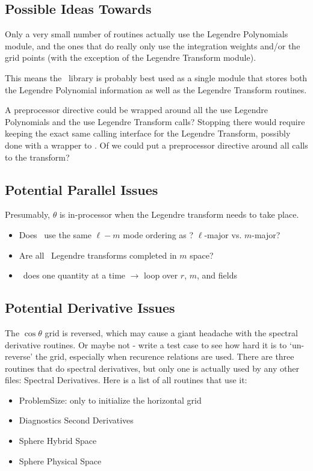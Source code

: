 \documentclass[10pt,letterpaper]{article}
\begin{document}
\subsection{Possible Ideas Towards \shtns}
Only a very small number of routines actually use the Legendre Polynomials module,
and the ones that do really only use the integration weights and/or the grid points
(with the exception of the Legendre Transform module).

This means the \shtns\ library is probably best used as a single module that stores
both the Legendre Polynomial information as well as the Legendre Transform routines.

A preprocessor directive could be wrapped around all the use Legendre Polynomials and
the use Legendre Transform calls? Stopping there would require keeping the exact same
calling interface for the Legendre Transform, possibly done with a wrapper to \shtns.
Of we could put a preprocessor directive around all calls to the transform?

\subsection{Potential Parallel Issues}
Presumably, $\theta$ is in-processor when the Legendre transform needs to take place.
\begin{itemize}
  \item Does \rayleigh\ use the same $\ell-m$ mode ordering as \shtns?
        $\ell$-major vs. $m$-major?
  \item Are all \rayleigh\ Legendre transforms completed in $m$ space?
  \item \shtns\ does one quantity at a time $\rightarrow$ loop over $r$, $m$, and fields
\end{itemize}

\subsection{Potential Derivative Issues}
The $\cos\theta$ grid is reversed, which may cause a giant headache with the spectral
derivative routines. Or maybe not - write a test case to see how hard it is to
`un-reverse' the grid, especially when recurence relations are used. There are three
routines that do spectral derivatives, but only one is actually used by any other
files: Spectral Derivatives. Here is a list of all routines that use it:
\begin{itemize}
  \item ProblemSize: only to initialize the horizontal grid
  \item Diagnostics Second Derivatives
  \item Sphere Hybrid Space
  \item Sphere Physical Space
\end{itemize}
\end{document}
